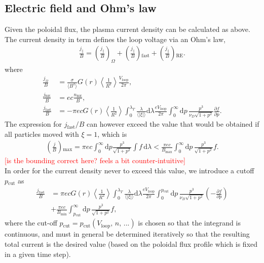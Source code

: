 \documentclass[11pt,a4paper]{article}
\newcommand{\rd}{\ensuremath{\mathrm{d}}}
\newcommand{\sub}[1]{\ensuremath{_{\text{#1}}}}
\begin{document}
\subsection{Electric field and Ohm's law}
Given the poloidal flux, the plasma current density can be calculated as above. The current density in term defines the loop voltage via an Ohm's law,%
\begin{align}
\frac{j_\parallel}{B} = \left(\frac{j_\parallel}{B}\right)_\Omega + \left(\frac{j_\parallel}{B}\right)\sub{fast} + \left(\frac{j_\parallel}{B}\right)\sub{RE}.
\end{align}
where
\begin{align}
\frac{j_\Omega}{B} &= \frac{\sigma}{\langle B^2\rangle }G(r)\left\langle\frac{1}{R^2}\right\rangle \frac{V\sub{loop}}{2\pi}, \nonumber \\
\frac{j\sub{RE}}{B} &= ec\frac{n\sub{RE}}{B},  \\
\frac{j\sub{fast}}{B} &= -\pi e c G(r)\left\langle\frac{1}{R^2}\right\rangle \int_0^{\lambda_T}\frac{\lambda}{\langle|\xi|\rangle}\rd\lambda \frac{eV\sub{loop}}{2\pi}\int_0^\infty \rd p \, \frac{p^3}{\nu_D \sqrt{1+p^2}}\frac{\partial f}{\partial p} \nonumber.
\end{align}
The expression for $j\sub{fast}/B$ can however exceed the value that would be obtained if all particles moved with $\xi=1$, which is
\begin{align}
\left(\frac{j}{B}\right)\sub{max} = \pi e c \int_0^\infty \rd p \frac{p^3}{\sqrt{1+p^2}} \int f \,\rd \lambda < \frac{\pi e c}{B\sub{max}} \int_0^\infty \rd p \,\frac{p^3}{\sqrt{1+p^2}}f.
\end{align}
\textcolor{red}{[is the bounding correct here? feels a bit counter-intuitive]} \\
In order for the current density never to exceed this value, we introduce a cutoff $p\sub{cut}$ as
\begin{align}
\frac{j\sub{fast}}{B} &= \pi e c G(r)\left\langle\frac{1}{R^2}\right\rangle \int_0^{\lambda_T}\frac{\lambda}{\langle|\xi|\rangle}\rd\lambda \frac{eV\sub{loop}}{2\pi}\int_0^{p\sub{cut}} \rd p \, \frac{p^3}{\nu_D \sqrt{1+p^2}}\left(-\frac{\partial f}{\partial p}\right) \nonumber \\
&+\frac{\pi e c}{B\sub{min}} \int_{p\sub{cut}}^\infty \rd p \,\frac{p^3}{\sqrt{1+p^2}}f,
\end{align}
where the cut-off $p\sub{cut} = p\sub{cut}(V\sub{loop},\,n,\,...)$ is chosen so that the integrand is continuous, and must in general be determined iteratively so that the resulting total current is the desired value (based on the poloidal flux profile which is fixed in a given time step).
\end{document}
